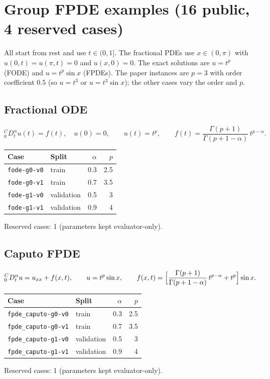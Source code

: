 \documentclass[11pt]{article}
\newcommand{\Caputo}[1]{{}^{C}_{0}D_t^{#1}}
\begin{document}
\section{Group FPDE examples (16 public, 4 reserved cases)}
All start from rest and use $t\in(0,1]$. The fractional PDEs use $x\in(0,\pi)$ with $u(0,t)=u(\pi,t)=0$ and
$u(x,0)=0$. The exact solutions are $u=t^{p}$ (FODE) and $u=t^{p}\sin x$ (FPDEs). The paper instances are
$p=3$ with order coefficient $0.5$ (so $u=t^3$ or $u=t^3\sin x$); the other cases vary the order and $p$.

\subsection{Fractional ODE}
\begin{equation*}
\Caputo{\alpha}u(t) = f(t),\quad u(0)=0,\qquad u(t)=t^{p},\qquad
f(t)=\frac{\Gamma(p+1)}{\Gamma(p+1-\alpha)}\,t^{p-\alpha}.
\end{equation*}

\begin{center}\small
\begin{tabular}{llrr}
\toprule
Case & Split & $\alpha$ & $p$ \\
\midrule
\texttt{fode-g0-v0} & train & 0.3 & 2.5 \\
\texttt{fode-g0-v1} & train & 0.7 & 3.5 \\
\texttt{fode-g1-v0} & validation & 0.5 & 3 \\
\texttt{fode-g1-v1} & validation & 0.9 & 4 \\
\bottomrule
\end{tabular}
\end{center}
\noindent Reserved cases: 1 (parameters kept evaluator-only).

\subsection{Caputo FPDE}
\begin{equation*}
\Caputo{\alpha}u = u_{xx} + f(x,t),\qquad u=t^{p}\sin x,\qquad
f(x,t)=\Bigl[\frac{\Gamma(p+1)}{\Gamma(p+1-\alpha)}\,t^{p-\alpha} + t^{p}\Bigr]\sin x.
\end{equation*}

\begin{center}\small
\begin{tabular}{llrr}
\toprule
Case & Split & $\alpha$ & $p$ \\
\midrule
\texttt{fpde\_caputo-g0-v0} & train & 0.3 & 2.5 \\
\texttt{fpde\_caputo-g0-v1} & train & 0.7 & 3.5 \\
\texttt{fpde\_caputo-g1-v0} & validation & 0.5 & 3 \\
\texttt{fpde\_caputo-g1-v1} & validation & 0.9 & 4 \\
\bottomrule
\end{tabular}
\end{center}
\noindent Reserved cases: 1 (parameters kept evaluator-only).
\end{document}
